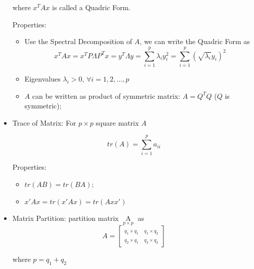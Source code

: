 \begin{itemize}[topsep=6pt,itemsep=4pt]
        where $ x^TAx $ is called a Quadric Form.

        Properties:
        \begin{itemize}[topsep=6pt,itemsep=4pt]
            \item Use the Spectral Decomposition of $ A $, we can write the Quadric Form as
            \begin{equation}
                x^TAx=x^TP\Lambda P^Tx=y^T\Lambda y=\sum_{i=1}^p\lambda_iy_i^2=\sum_{i=1}^p(\sqrt{\lambda_i}y_i)^2 
            \end{equation}
            
            
            \item Eigenvalues $ \lambda _i>0,\,\forall i=1,2,\ldots,p $
            \item $ A $ can be written as product of symmetric matrix: $ A= Q^TQ$ ($ Q $ is symmetric);
        \end{itemize}

        \item Trace of Matrix: For $ p\times p $ square matrix $ A $
            
            \begin{equation}
                tr(A) =\sum_{i=1}^p a_{ii}
            \end{equation}
            
            Properties:
            \begin{itemize}[topsep=2pt,itemsep=2pt]
                \item $ tr(AB)=tr(BA)  $;
                \item $ x'Ax=tr(x'Ax)=tr(Axx') $
            \end{itemize}
            
                
        \item Matrix Partition: partition matrix $ \mathop{A}\limits_{p\times p} $ as 
        \begin{equation}
            A=         
            \begin{bmatrix}
                \mathop{A_{11} }\limits_{q_1\times q_1}&\mathop{A_{12} }\limits_{q_1\times q_2} \\
                \mathop{A_{21} }\limits_{q_2\times q_1}&\mathop{A_{22} }\limits_{q_2\times q_2}   
            \end{bmatrix}   
        \end{equation}

        where $ p=q_1+q_2 $      
        


\end{itemize}
